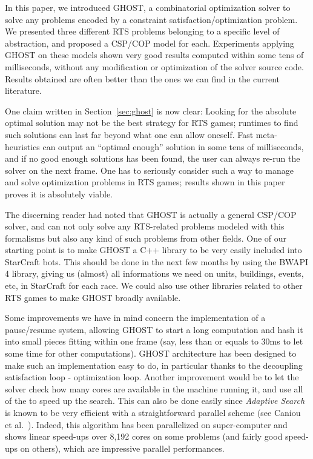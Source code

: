 \documentclass[journal]{IEEEtran}
\newcommand{\csp}{\textsc{CSP}\xspace}
\newcommand{\cop}{\textsc{COP}\xspace}
\newcommand{\ghost}{\textsc{GHOST}\xspace}
\begin{document}
In  this paper,  we  introduced \ghost,  a combinatorial  optimization
solver   to    solve   any   problems   encoded    by   a   constraint
satisfaction/optimization problem.   We presented three  different RTS
problems belonging to a specific  level of abstraction, and proposed a
\csp/\cop model for each. Experiments  applying \ghost on these models
shown very  good results  computed within  some tens  of milliseconds,
without  any  modification  or   optimization  of  the  solver  source
code. Results obtained  are often better than the ones  we can find in
the current literature.

One claim written in Section~\ref{sec:ghost} is now clear: Looking for
the absolute  optimal solution may  not be  the best strategy  for RTS
games; runtimes  to find such solutions  can last far beyond  what one
can  allow  oneself.  Fast  meta-heuristics  can  output an  ``optimal
enough'' solution in some tens of  milliseconds, and if no good enough
solutions has been found, the user can always re-run the solver on the
next frame.   One has to seriously  consider such a way  to manage and
solve optimization problems in RTS  games; results shown in this paper
proves it is absolutely viable.

The  discerning reader  had noted  that \ghost  is actually  a general
\csp/\cop  solver, and  can not  only solve  any RTS-related  problems
modeled with this  formalisms but also any kind of  such problems from
other  fields. One  of our  starting  point is  to make  \ghost a  C++
library to be very easily included into StarCraft bots. This should be
done in the  next few months by  using the BWAPI 4  library, giving us
(almost) all informations we need on units, buildings, events, etc, in
StarCraft for each race.  We could also use other libraries related to
other RTS games to make \ghost broadly available.

Some  improvements we  have in  mind concern  the implementation  of a
pause/resume system, allowing  \ghost to start a  long computation and
hash it into small pieces fitting  within one frame (say, less than or
equals  to 30ms  to let  some  time for  other computations).   \ghost
architecture has been designed to  make such an implementation easy to
do,  in  particular  thanks  to the  decoupling  satisfaction  loop  -
optimization  loop. Another  improvement would  be to  let the  solver
check how many cores are available  in the machine running it, and use
all of the to speed up the  search. This can also be done easily since
{\it  Adaptive  Search}   is  known  to  be  very   efficient  with  a
straightforward      parallel      scheme     (see      Caniou      et
al.~\cite{Caniou14}). Indeed, this algorithm  has been parallelized on
super-computer and  shows linear  speed-ups over  8,192 cores  on some
problems (and fairly  good speed-ups on others),  which are impressive
parallel performances.
\end{document}
